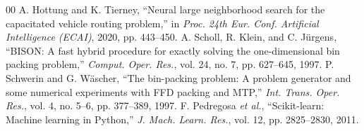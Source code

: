 \documentclass[conference]{IEEEtran}
\begin{document}
\begin{thebibliography}{00}
	 A. Hottung and K. Tierney, ``Neural large neighborhood search for the capacitated vehicle routing problem,'' in \textit{Proc. 24th Eur. Conf. Artificial Intelligence (ECAI)}, 2020, pp. 443--450.
	 A. Scholl, R. Klein, and C. J\"urgens, ``BISON: A fast hybrid procedure for exactly solving the one-dimensional bin packing problem,'' \textit{Comput. Oper. Res.}, vol. 24, no. 7, pp. 627--645, 1997.
	 P. Schwerin and G. W\"ascher, ``The bin-packing problem: A problem generator and some numerical experiments with FFD packing and MTP,'' \textit{Int. Trans. Oper. Res.}, vol. 4, no. 5--6, pp. 377--389, 1997.
	 F. Pedregosa \textit{et al.}, ``Scikit-learn: Machine learning in Python,'' \textit{J. Mach. Learn. Res.}, vol. 12, pp. 2825--2830, 2011.
\end{thebibliography}
\end{document}
